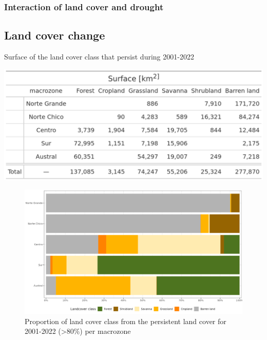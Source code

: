 \documentclass[
  authoryear,
  preprint,
  3p,
  onecolumn]{elsarticle}
\begin{document}
\hypertarget{interaction-of-land-cover-and-drought-1}{%
\subsubsection{Interaction of land cover and
drought}\label{interaction-of-land-cover-and-drought-1}}

\hypertarget{land-cover-change-1}{%
\subsection{Land cover change}\label{land-cover-change-1}}

\begin{table}[!ht]
\caption{Surface of the land cover class that persist during 2001-2022}
\label{tab-landcoverSurf}
\includegraphics[width = .5\textwidth]{../output/figs/table_surface_landcover_macrozone.png}
\end{table}

\begin{figure}[!ht]

{\centering \includegraphics{../output/figs/LC_pers80_per_macrozone.png}

}

\caption{\label{fig-LCprop}Proportion of land cover class from the
persistent land cover for 2001-2022 (\textgreater80\%) per macrozone}

\end{figure}
\end{document}
